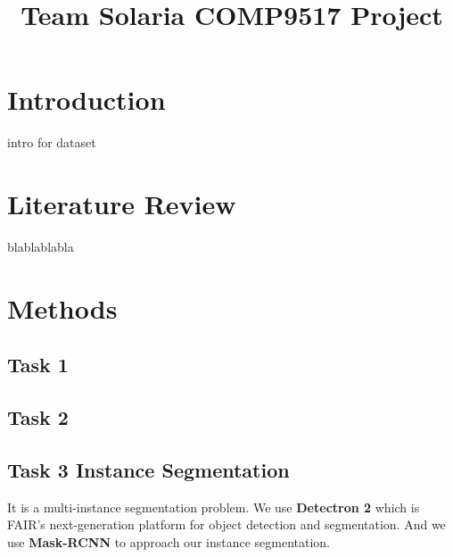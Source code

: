\documentclass[conference]{IEEEtran}
\begin{document}
%
\title{Team Solaria COMP9517 Project}


\author{
\and
{}
\IEEEauthorblockA{}
\and
{}
}


\maketitle
\IEEEpeerreviewmaketitle



\section{Introduction}
intro for dataset


\section{Literature Review}

blablablabla

\section{Methods}

\subsection{Task 1}

\subsection{Task 2}

\subsection{Task 3 Instance Segmentation}

It is a multi-instance segmentation problem. We use \textbf{Detectron 2}\cite{wu2019detectron2} which is FAIR's next-generation platform for object detection and segmentation. And we use \textbf{Mask-RCNN}\cite{He_2017} to approach our instance segmentation.
\end{document}
